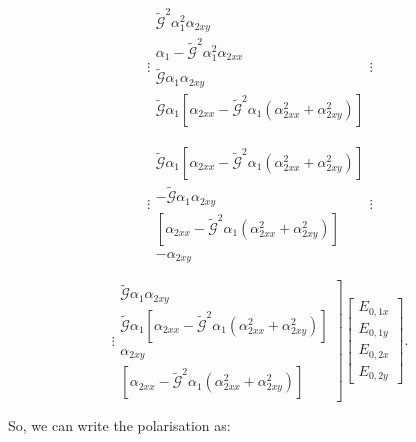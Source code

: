 \[
\vdots\begin{array}{c}
\tilde{\mathcal{G}}^{2}\alpha_{1}^{2}\alpha_{2xy}\\
\alpha_{1}-\tilde{\mathcal{G}}^{2}\alpha_{1}^{2}\alpha_{2xx}\\
\tilde{\mathcal{G}}\alpha_{1}\alpha_{2xy}\\
\tilde{\mathcal{G}}\alpha_{1}\left[\alpha_{2xx}-\tilde{\mathcal{G}}^{2}\alpha_{1}\left(\alpha_{2xx}^{2}+\alpha_{2xy}^{2}\right)\right]
\end{array}\vdots
\]

\[
\vdots\begin{array}{c}
\tilde{\mathcal{G}}\alpha_{1}\left[\alpha_{2xx}-\tilde{\mathcal{G}}^{2}\alpha_{1}\left(\alpha_{2xx}^{2}+\alpha_{2xy}^{2}\right)\right]\\
-\tilde{\mathcal{G}}\alpha_{1}\alpha_{2xy}\\
\left[\alpha_{2xx}-\tilde{\mathcal{G}}^{2}\alpha_{1}\left(\alpha_{2xx}^{2}+\alpha_{2xy}^{2}\right)\right]\\
-\alpha_{2xy}
\end{array}\vdots
\]

\[
\left.\vdots\begin{array}{c}
\tilde{\mathcal{G}}\alpha_{1}\alpha_{2xy}\\
\tilde{\mathcal{G}}\alpha_{1}\left[\alpha_{2xx}-\tilde{\mathcal{G}}^{2}\alpha_{1}\left(\alpha_{2xx}^{2}+\alpha_{2xy}^{2}\right)\right]\\
\alpha_{2xy}\\
\left[\alpha_{2xx}-\tilde{\mathcal{G}}^{2}\alpha_{1}\left(\alpha_{2xx}^{2}+\alpha_{2xy}^{2}\right)\right]
\end{array}\right]\begin{bmatrix}E_{0,1x}\\
E_{0,1y}\\
E_{0,2x}\\
E_{0,2y}
\end{bmatrix}.
\]

So, we can write the polarisation as:


